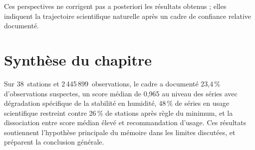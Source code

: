 Ces perspectives ne corrigent pas a posteriori les résultats obtenus ; elles
indiquent la trajectoire scientifique naturelle après un cadre de confiance
relative documenté.

\section{Synthèse du chapitre}
\label{sec:synthese_ch3}

Sur 38~stations et 2\,445\,899~observations, le cadre a documenté 23,4\,\%
d'observations suspectes, un score médian de 0,965 au niveau des séries avec
dégradation spécifique de la stabilité en humidité, 48\,\% de séries en usage
scientifique restreint contre 26\,\% de stations après règle du minimum, et la
dissociation entre score médian élevé et recommandation d'usage. Ces résultats
soutiennent l'hypothèse principale du mémoire dans les limites discutées, et
préparent la conclusion générale.

